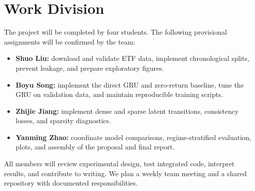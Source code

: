 \documentclass{article}
\begin{document}
\section{Work Division}
The project will be completed by four students. The following provisional assignments will be confirmed by the team:
\begin{itemize}
\item \textbf{Shuo Liu:} download and validate ETF data, implement chronological splits, prevent leakage, and prepare exploratory figures.
\item \textbf{Boyu Song:} implement the direct GRU and zero-return baseline, tune the GRU on validation data, and maintain reproducible training scripts.
\item \textbf{Zhijie Jiang:} implement dense and sparse latent transitions, consistency losses, and sparsity diagnostics.
\item \textbf{Yanming Zhao:} coordinate model comparisons, regime-stratified evaluation, plots, and assembly of the proposal and final report.
\end{itemize}
All members will review experimental design, test integrated code, interpret results, and contribute to writing. We plan a weekly team meeting and a shared repository with documented responsibilities.
\end{document}

